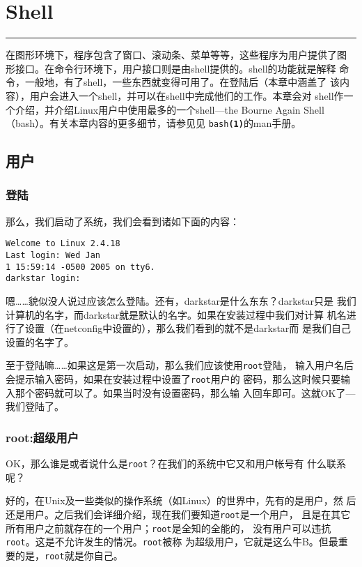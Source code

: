 
\chapter{Shell}
\label{chap:shell}

\begin{flushleft}
\rule[0mm]{\textwidth}{.1pt}
\end{flushleft}

在图形环境下，程序包含了窗口、滚动条、菜单等等，这些程序为用户提供了图
形接口。在命令行环境下，用户接口则是由shell提供的。shell的功能就是解释
命令，一般地，有了shell，一些东西就变得可用了。在登陆后（本章中涵盖了
该内容），用户会进入一个shell，并可以在shell中完成他们的工作。本章会对
shell作一个介绍，并介绍Linux用户中使用最多的一个shell---the Bourne
Again Shell（bash）。有关本章内容的更多细节，请参见见
\texttt{bash\textbf{(1)}}的man手册。

\section{用户}
\label{sec:shell:users}

\subsection{登陆}
\label{sec:shell:users:loggingIn}
那么，我们启动了系统，我们会看到诸如下面的内容：
\begin{Verbatim}[frame=single,commandchars=\\\{\}]
Welcome to Linux 2.4.18
Last login: Wed Jan
1 15:59:14 -0500 2005 on tty6.
darkstar login:
\end{Verbatim}
嗯……貌似没人说过应该怎么登陆。还有，darkstar是什么东东？darkstar只是
我们计算机的名字，而darkstar就是默认的名字。如果在安装过程中我们对计算
机名进行了设置（在netconfig中设置的），那么我们看到的就不是darkstar而
是我们自己设置的名字了。

至于登陆嘛……如果这是第一次启动，那么我们应该使用\texttt{root}登陆，
输入用户名后会提示输入密码，如果在安装过程中设置了\texttt{root}用户的
密码，那么这时候只要输入那个密码就可以了。如果当时没有设置密码，那么输
入回车即可。这就OK了---我们登陆了。

\subsection{root:超级用户}
\label{sec:shell:users:root}
OK，那么谁是或者说什么是\texttt{root}？在我们的系统中它又和用户帐号有
什么联系呢？

好的，在Unix及一些类似的操作系统（如Linux）的世界中，先有的是用户，然
后还是用户。之后我们会详细介绍，现在我们要知道\texttt{root}是一个用户，
且是在其它所有用户之前就存在的一个用户；\texttt{root}是全知的全能的，
没有用户可以违抗\texttt{root}。这是不允许发生的情况。\texttt{root}被称
为超级用户，它就是这么牛B。但最重要的是，\texttt{root}就是你自己。

